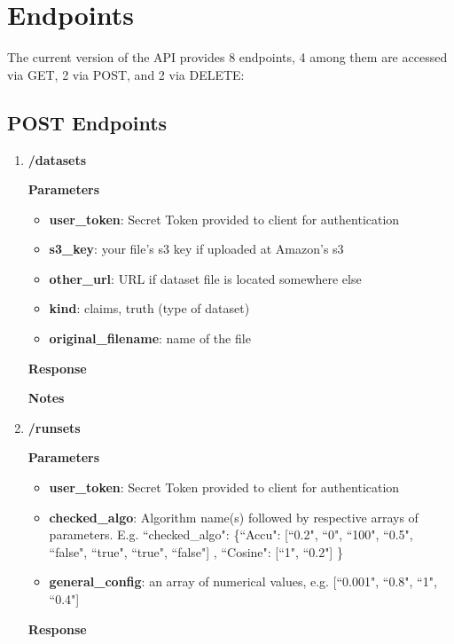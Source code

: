 \documentclass[a4paper,10pt]{scrartcl}
\begin{document}
\section{Endpoints}
The current version of the API provides 8 endpoints, 4 among them are accessed via GET, 2 via POST, and 2 via DELETE:
\subsection{POST Endpoints}
\begin{enumerate}
 \item \textbf{/datasets}
\textbf{Parameters}
\begin{itemize}
\item \textbf{user\_token}: Secret Token provided to client for authentication 
\item \textbf{s3\_key}: your file's s3 key if uploaded at Amazon's s3
\item \textbf{other\_url}: URL if dataset file is located somewhere else
\item \textbf{kind}: claims, truth (type of dataset)
\item \textbf{original\_filename}: name of the file 
\end{itemize}
\textbf{Response}
\textbf{Notes}
%
 \item \textbf{/runsets}
\textbf{Parameters}
\begin{itemize}
 \item \textbf{user\_token}: Secret Token provided to client for authentication 
 \item  \textbf{checked\_algo}: Algorithm name(s) followed by respective arrays of parameters. E.g. ``checked\_algo": \{``Accu": [``0.2", ``0", ``100", ``0.5", ``false", ``true", ``true", ``false"] , ``Cosine": [``1", ``0.2"] \}
 \item \textbf{general\_config}: an array of numerical values, e.g. [``0.001", ``0.8", ``1", ``0.4"]
\end{itemize}
\textbf{Response}
\end{enumerate}
\end{document}
